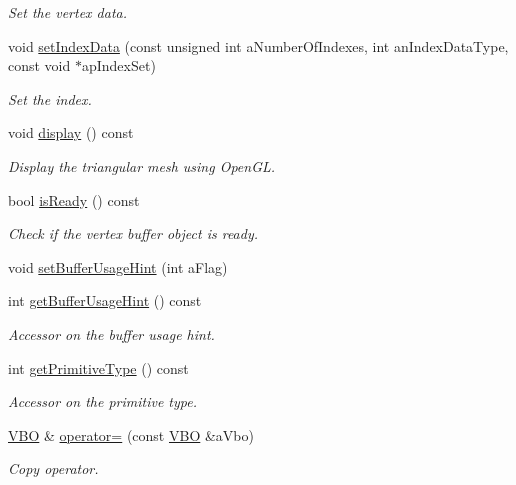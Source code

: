 \begin{DoxyCompactItemize}
\begin{DoxyCompactList}\small\item\em Set the vertex data. \end{DoxyCompactList}\item 
void \hyperlink{class_graphics_1_1_v_b_o_ad898dedd6cfc1323666d0c92362b0cb6}{setIndexData} (const unsigned int aNumberOfIndexes, int anIndexDataType, const void $\ast$apIndexSet)
\begin{DoxyCompactList}\small\item\em Set the index. \end{DoxyCompactList}\item 
void \hyperlink{class_graphics_1_1_v_b_o_a317d5e66f907a1c4ce1c62fd13027e94}{display} () const 
\begin{DoxyCompactList}\small\item\em Display the triangular mesh using OpenGL. \end{DoxyCompactList}\item 
bool \hyperlink{class_graphics_1_1_v_b_o_a1d0a57f5c94120de14f5f7fc146a7e02}{isReady} () const 
\begin{DoxyCompactList}\small\item\em Check if the vertex buffer object is ready. \end{DoxyCompactList}\item 
void \hyperlink{class_graphics_1_1_v_b_o_ae62f61a5171472bbc4a4b009b8ab197c}{setBufferUsageHint} (int aFlag)
\item 
int \hyperlink{class_graphics_1_1_v_b_o_acb61a094b658fee807d4964cfbec3211}{getBufferUsageHint} () const 
\begin{DoxyCompactList}\small\item\em Accessor on the buffer usage hint. \end{DoxyCompactList}\item 
int \hyperlink{class_graphics_1_1_v_b_o_a3ae4a9302e98c599f2a7688c1417d083}{getPrimitiveType} () const 
\begin{DoxyCompactList}\small\item\em Accessor on the primitive type. \end{DoxyCompactList}\item 
\hyperlink{class_graphics_1_1_v_b_o}{VBO} \& \hyperlink{class_graphics_1_1_v_b_o_a9d3f17037047f1febb746cc0bdf65280}{operator=} (const \hyperlink{class_graphics_1_1_v_b_o}{VBO} \&aVbo)
\begin{DoxyCompactList}\small\item\em Copy operator. \end{DoxyCompactList}\end{DoxyCompactItemize}
